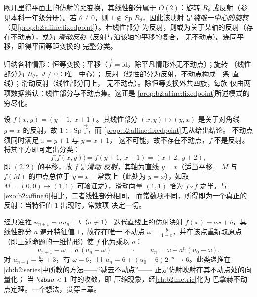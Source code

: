 \begin{example}[平面等距变换的完整分类]\label{ex:b2:affine:isometries}
欧几里得平面上的仿射等距变换，其线性部分属于
$O(2)$：旋转 $R_\theta$ 或反射（参见本科一年级分册）。若
$\theta \neq 0$，则 $1 \notin \operatorname{Sp} R_\theta$，因此该映射
是\emph{绕唯一中心的旋转}
（见\cref{prop:b2:affine:fixedpoint}）。若线性部分
为反射，则或为关于某轴的反射（存在不动点），或为
\emph{滑动反射}（反射与沿该轴的平移的复合，
无不动点）。连同平移，即得平面等距变换的
完整分类。
\end{example}

\begin{remark}[平面等距变换一览]
归纳各种情形：恒等变换；平移（$\vec f =
\mathrm{id}$，除平凡情形外无不动点）；旋转
（线性部分为 $R_\theta$，$\theta \neq 0$：唯一中心）；
反射（线性部分为反射，不动点构成一条
直线）；滑动反射（线性部分同上，
无不动点）。除恒等变换外共四族，每族
仅由两项数据辨认：线性部分与不动点集。这正是
\cref{prop:b2:affine:fixedpoint}所述模式的
穷尽化。
\end{remark}

\begin{example}\label{ex:b2:affine:glide}
设 $f(x, y) = (y + 1,\ x + 1)$。其线性部分 $(x, y)
\mapsto (y, x)$ 是关于对角线 $y = x$ 的反射，故
$1 \in \operatorname{Sp}\vec f$，而
\cref{prop:b2:affine:fixedpoint}无从给出结论。
不动点须同时满足 $x = y + 1$ 与 $y = x + 1$，
这不可能，故不存在不动点，$f$ 不是反射。
将其平方即可定出分类：
\[
f\bigl(f(x, y)\bigr) = f(y + 1,\ x + 1) = (x + 2,\ y + 2),
\]
即 $(2, 2)$ 的平移，故 $f$ 是\emph{滑动
反射}，其轴为直线 $y = x$（适当平移，
$M$ 与 $f(M)$ 的中点总位于
$y = x + {}$常数上（此处为 $y = x$），如取 $M = (0,
0) \mapsto (1,1)$ 可验证之），滑动向量 $(1, 1)$ 恰为 $f
\circ f$ 之半。与\cref{exo:b2:affine:6}相比，二者线性部分相同，
而常数项不同，所得即为一个真正的
反射：当特征值 $1$ 出现时，常数项
决定一切。
\end{example}

\begin{example}\label{ex:b2:affine:recursion}
经典递推 $u_{n+1} = au_n + b$（$a \neq 1$）
迭代直线上的仿射映射 $f(x) = ax + b$，其
线性部分 $a$ 避开特征值 $1$，故存在唯一
不动点 $\omega = \frac{b}{1-a}$，并在该点重新取原点
（即上述命题的一维情形）使
$f$ 化为乘以 $a$：
\[
u_{n+1} - \omega = a\,(u_n - \omega)
\qquad\Longrightarrow\qquad
u_n = \omega + a^n(u_0 - \omega) .
\]
对 $u_{n+1} = \frac{u_n}2 + 3$，有 $\omega = 6$，且 $u_n = 6 +
(u_0 - 6)2^{-n} \to 6$。此类递推在
\cref{ch:b2:series}中所教的方法——“减去不动点”——
正是仿射映射在其不动点处的向量化；
当 $\abs a < 1$ 时的收敛，即
压缩现象，经\cref{ch:b2:metric}化为
巴拿赫不动点定理。一个想法，贯穿三章。
\end{example}

